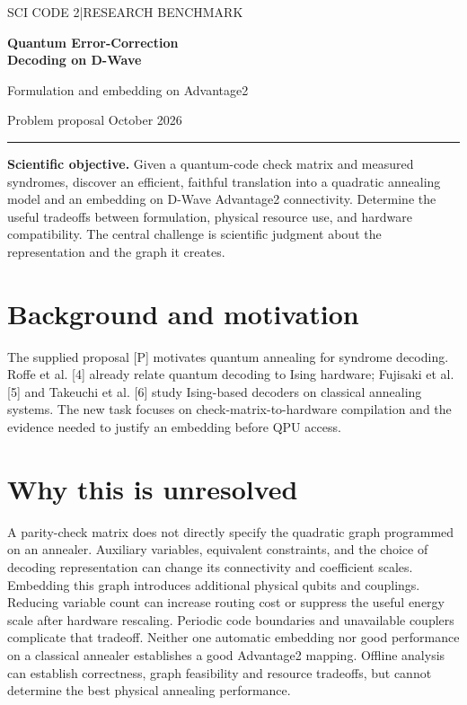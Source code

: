 \documentclass[11pt,letterpaper]{article}
\begin{document}
\thispagestyle{plain}
{\color{accent}\small\sffamily SCI CODE 2\quad|\quad RESEARCH BENCHMARK}\par\vspace{8pt}
{\LARGE\bfseries Quantum Error-Correction\\[2pt] Decoding on D-Wave}\par\vspace{5pt}
{\large Formulation and embedding on Advantage2}\par\vspace{5pt}
{\small Problem proposal\quad\textbullet{} October 2026}\par\vspace{7pt}
{\color{accent}\hrule}\vspace{10pt}

\textbf{Scientific objective.} Given a quantum-code check matrix and measured syndromes, discover an efficient, faithful translation into a quadratic annealing model and an embedding on D-Wave Advantage2 connectivity. Determine the useful tradeoffs between formulation, physical resource use, and hardware compatibility. The central challenge is scientific judgment about the representation and the graph it creates.\par

\section{Background and motivation}

The supplied proposal [P] motivates quantum annealing for syndrome decoding. Roffe et al. [4] already relate quantum decoding to Ising hardware; Fujisaki et al. [5] and Takeuchi et al. [6] study Ising-based decoders on classical annealing systems. The new task focuses on check-matrix-to-hardware compilation and the evidence needed to justify an embedding before QPU access.\par

\section{Why this is unresolved}

A parity-check matrix does not directly specify the quadratic graph programmed on an annealer. Auxiliary variables, equivalent constraints, and the choice of decoding representation can change its connectivity and coefficient scales. Embedding this graph introduces additional physical qubits and couplings. Reducing variable count can increase routing cost or suppress the useful energy scale after hardware rescaling. Periodic code boundaries and unavailable couplers complicate that tradeoff. Neither one automatic embedding nor good performance on a classical annealer establishes a good Advantage2 mapping. Offline analysis can establish correctness, graph feasibility and resource tradeoffs, but cannot determine the best physical annealing performance.\par
\end{document}
